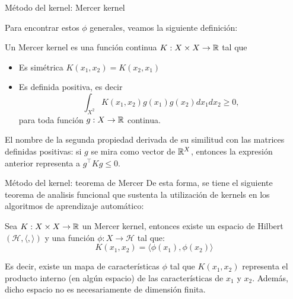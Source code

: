 \documentclass[9pt]{beamer}
\begin{document}
\begin{frame}{Método del kernel: Mercer kernel}

Para encontrar estos $\phi$ generales, veamos la siguiente definición:

\begin{definition}
    Un Mercer kernel es una función continua $K: X\times X \to \mathbb{R}$ tal que
\begin{itemize}
    \item Es simétrica $K(x_1 , x_2 ) = K (x_2 , x_1)$
    \item Es definida positiva, es decir
    $$\int_{X^2} K(x_1, x_2)g(x_1) g(x_2) dx_1 dx_2\geq 0,$$
    para toda función $g:X\rightarrow\mathbb{R}$ continua. 
\end{itemize}

\end{definition} \pause

El nombre de la segunda propiedad derivada de su similitud con las matrices definidas positivas: si $g$ se mira como vector de $\mathbb{R}^X$, entonces la expresión anterior representa a $g^\top Kg\leq 0$.

\end{frame}

\begin{frame}{Método del kernel: teorema de Mercer}
	De esta forma, se tiene el siguiente teorema de analisis funcional que sustenta la utilización de kernels en los algoritmos de aprendizaje automático:

\begin{theorem}
	Sea $K: X\times X \to \mathbb{R}$ un Mercer kernel, entonces existe un espacio de Hilbert $\left(\mathcal{H},\langle,\rangle\right)$ y una función $\phi: X \to \mathcal{H}$ tal que:
	\begin{equation*}
    K(x_1, x_2) = \langle \phi(x_1) , \phi(x_2) \rangle
\end{equation*}
\end{theorem} \pause

Es decir, existe un mapa de características $\phi$ tal que $K(x_1, x_2)$ representa el producto interno (en algún espacio) de las características de $x_1$ y $x_2$. Además, dicho espacio no es necesariamente de dimensión finita.
\end{frame}
\end{document}
